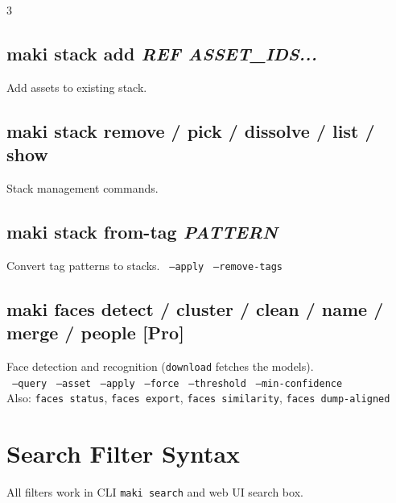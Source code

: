 \documentclass[a4paper,landscape,8pt]{article}
\newcommand{\cmd}[1]{\texttt{\footnotesize #1}}
\newcommand{\opt}[1]{\texttt{\scriptsize\color{maki-stone} #1}}
\newcommand{\pro}{\textcolor{maki-teal}{\scriptsize [Pro]}}
\begin{document}
\begin{multicols}{3}
\subsection{maki stack add \textit{REF ASSET\_IDS...}}
Add assets to existing stack.

\subsection{maki stack remove / pick / dissolve / list / show}
Stack management commands.

\subsection{maki stack from-tag \textit{PATTERN}}
Convert tag patterns to stacks. \opt{--apply} \opt{--remove-tags}

\subsection{maki faces detect / cluster / clean / name / merge / people \pro}
Face detection and recognition (\cmd{download} fetches the models). \\
\opt{--query} \opt{--asset} \opt{--apply} \opt{--force} \opt{--threshold} \opt{--min-confidence} \\
Also: \cmd{faces status}, \cmd{faces export}, \cmd{faces similarity}, \cmd{faces dump-aligned}

\columnbreak

\section{Search Filter Syntax}

All filters work in CLI \cmd{maki search} and web UI search box.


\end{multicols}
\end{document}
